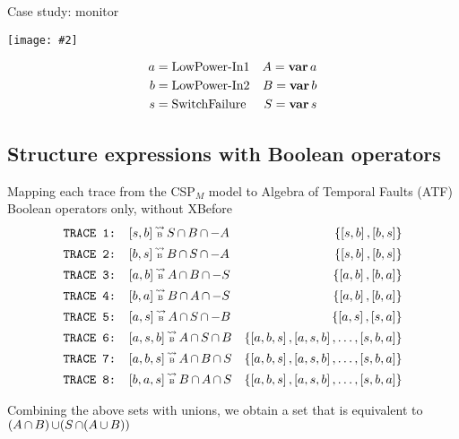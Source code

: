 \documentclass{beamer}
\def\ATF{%
	Algebra of Temporal Faults (ATF)%
	\gdef\ATF{ATF\xspace}%
	\gdef\iATF{an ATF\xspace}%
	\gdef\IATF{An ATF\xspace}%
	\xspace%
}
\def\iATF{%
	an Algebra of Temporal Faults (ATF)%
	\gdef\ATF{ATF\xspace}%
	\gdef\iATF{an ATF\xspace}%
	\gdef\IATF{An ATF\xspace}%
	\xspace%
}
\def\IATF{%
	An Algebra of Temporal Faults (ATF)%
	\gdef\ATF{ATF\xspace}%
	\gdef\iATF{an ATF\xspace}%
	\gdef\IATF{An ATF\xspace}%
	\xspace%
}
\newcommand{\includegraphicsaspectratio}[2][1]{%
  \texttt{[image: \#2]}%
}
\def\varop{\ensuremath\operatorname{\mathbf{var}}}
\newcommand{\var}[1]{\ensuremath\varop #1}
\def\union{\ensuremath\operatorname{\cup}}
\def\inter{\ensuremath\operatorname{\cap}}
\def\CSPm{CSP$_M$\xspace}
\def\tracetobool{\ensuremath\operatorname{\stackrel{\leadsto}{\text{\tiny B}}}}
\begin{document}
\begin{frame}{Case study: monitor}
	\begin{center}
		\includegraphicsaspectratio[0.60]{blockDiagramMonitorInternals}
	\end{center}
	\begin{align*}
		a &= \text{LowPower-In1}& A = \var a\\
		b &= \text{LowPower-In2}& B = \var b\\
		s &= \text{SwitchFailure}& S = \var s
	\end{align*}
\end{frame}

\subsection{Structure expressions with Boolean operators}

\begin{frame}[fragile]{Mapping each trace from the \CSPm model to \ATF}{Boolean operators only, without XBefore}
{\scriptsize
	\begin{align*}
		\text{\texttt{TRACE 1: }}&[s,b] \tracetobool S \inter B \inter -A & \left\{\left[s,b\right],\left[b,s\right]\right\}\\
		\text{\texttt{TRACE 2: }}&[b,s] \tracetobool B \inter S \inter -A & \left\{\left[s,b\right],\left[b,s\right]\right\}\\
		\text{\texttt{TRACE 3: }}&[a,b] \tracetobool A \inter B \inter -S & \left\{\left[a,b\right],\left[b,a\right]\right\}\\
		\text{\texttt{TRACE 4: }}&[b,a] \tracetobool B \inter A \inter -S & \left\{\left[a,b\right],\left[b,a\right]\right\}\\
		\text{\texttt{TRACE 5: }}&[a,s] \tracetobool A \inter S \inter -B & \left\{\left[a,s\right],\left[s,a\right]\right\}\\
		\text{\texttt{TRACE 6: }}&[a,s,b] \tracetobool A \inter S \inter B & \left\{\left[a,b,s\right],\left[a,s,b\right],\ldots,\left[s,b,a\right]\right\}\\
		\text{\texttt{TRACE 7: }}&[a,b,s] \tracetobool A \inter B \inter S & \left\{\left[a,b,s\right],\left[a,s,b\right],\ldots,\left[s,b,a\right]\right\}\\
		\text{\texttt{TRACE 8: }}&[b,a,s] \tracetobool B \inter A \inter S & \left\{\left[a,b,s\right],\left[a,s,b\right],\ldots,\left[s,b,a\right]\right\}
	\end{align*}
}

Combining the above sets with unions, we obtain a set that is equivalent to $(A \inter B) \union (S \inter (A \union B))$
\end{frame}
\end{document}
